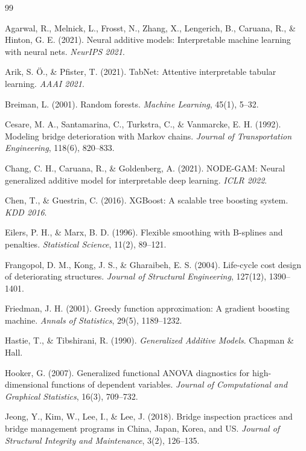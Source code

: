 \documentclass[twocolumn]{article}
\begin{document}
\begin{thebibliography}{99}

Agarwal, R., Melnick, L., Frosst, N., Zhang, X., Lengerich, B., Caruana, R., \& Hinton, G. E. (2021). Neural additive models: Interpretable machine learning with neural nets. \textit{NeurIPS 2021}.

Arik, S. Ö., \& Pfister, T. (2021). TabNet: Attentive interpretable tabular learning. \textit{AAAI 2021}.

Breiman, L. (2001). Random forests. \textit{Machine Learning}, 45(1), 5--32.

Cesare, M. A., Santamarina, C., Turkstra, C., \& Vanmarcke, E. H. (1992). Modeling bridge deterioration with Markov chains. \textit{Journal of Transportation Engineering}, 118(6), 820--833.

Chang, C. H., Caruana, R., \& Goldenberg, A. (2021). NODE-GAM: Neural generalized additive model for interpretable deep learning. \textit{ICLR 2022}.

Chen, T., \& Guestrin, C. (2016). XGBoost: A scalable tree boosting system. \textit{KDD 2016}.

Eilers, P. H., \& Marx, B. D. (1996). Flexible smoothing with B-splines and penalties. \textit{Statistical Science}, 11(2), 89--121.

Frangopol, D. M., Kong, J. S., \& Gharaibeh, E. S. (2004). Life-cycle cost design of deteriorating structures. \textit{Journal of Structural Engineering}, 127(12), 1390--1401.

Friedman, J. H. (2001). Greedy function approximation: A gradient boosting machine. \textit{Annals of Statistics}, 29(5), 1189--1232.

Hastie, T., \& Tibshirani, R. (1990). \textit{Generalized Additive Models}. Chapman \& Hall.

Hooker, G. (2007). Generalized functional ANOVA diagnostics for high-dimensional functions of dependent variables. \textit{Journal of Computational and Graphical Statistics}, 16(3), 709--732.

Jeong, Y., Kim, W., Lee, I., \& Lee, J. (2018). Bridge inspection practices and bridge management programs in China, Japan, Korea, and US. \textit{Journal of Structural Integrity and Maintenance}, 3(2), 126--135.


\end{thebibliography}
\end{document}
